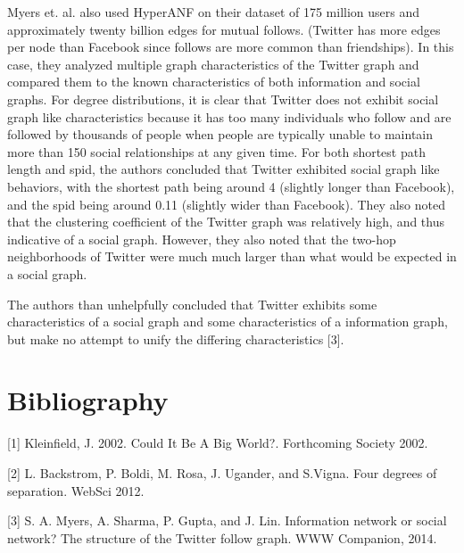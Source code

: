 \documentclass[prodmode,acmtecs]{acmsmall} %
\begin{document}
Myers et. al. also used HyperANF on their dataset of 175 million users and approximately twenty billion edges for mutual follows. (Twitter 
has more edges per node than Facebook since follows are more common than friendships). In this case, they analyzed multiple graph characteristics
of the Twitter graph and compared them to the known characteristics of both information and social graphs. For degree distributions, it is clear
that Twitter does not exhibit social graph like characteristics because it has too many individuals who follow and are followed by thousands 
of people when people are typically unable to maintain more than 150 social relationships at any given time. For both shortest path length and spid,
the authors concluded that Twitter exhibited social graph like behaviors, with the shortest path being around 4 (slightly longer than Facebook), and
the spid being around 0.11 (slightly wider than Facebook). They also noted that the clustering coefficient of the Twitter graph was relatively high,
and thus indicative of a social graph. However, they also noted that the two-hop neighborhoods of Twitter were much much larger than what 
would be expected in a social graph. 

The authors than unhelpfully concluded that Twitter exhibits some characteristics of a social graph and some characteristics of a information graph,
but make no attempt to unify the differing characteristics [3].

\section{Bibliography}
[1] Kleinfield, J. 2002. Could It Be A Big World?. Forthcoming Society 2002.

[2] L. Backstrom, P. Boldi, M. Rosa, J. Ugander, and S.Vigna. Four degrees of separation. WebSci 2012.

[3] S. A. Myers, A. Sharma, P. Gupta, and J. Lin. Information network or social network? The structure of the Twitter follow graph. WWW Companion, 2014.
\end{document}

